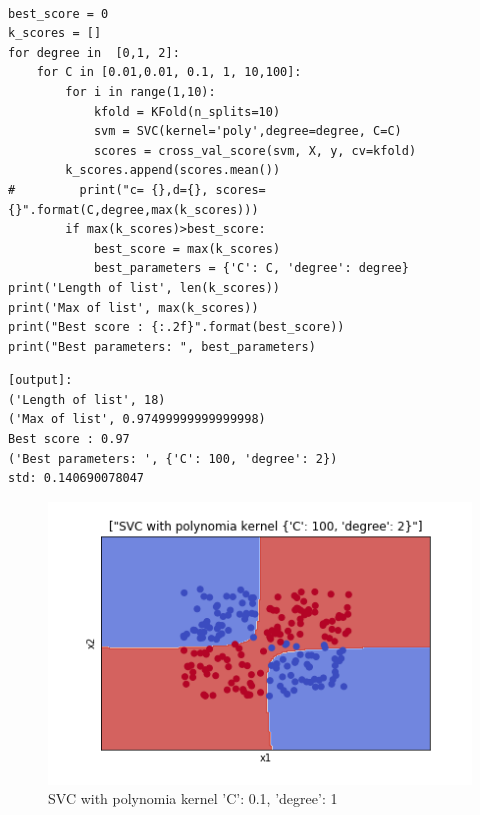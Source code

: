 \documentclass[10pt,a4paper]{article}
\begin{document}
\lstset{%
basicstyle=\small, %
identifierstyle=, %
stringstyle=\ttfamily, %
showstringspaces=false} %

\lstset{language=Python}          %

\begin{lstlisting}[label=loaddata,caption=Importing the data]  % Start your code-block

best_score = 0
k_scores = []
for degree in  [0,1, 2]:
    for C in [0.01,0.01, 0.1, 1, 10,100]:        
        for i in range(1,10):               
            kfold = KFold(n_splits=10)
            svm = SVC(kernel='poly',degree=degree, C=C)
            scores = cross_val_score(svm, X, y, cv=kfold)
        k_scores.append(scores.mean())
#         print("c= {},d={}, scores={}".format(C,degree,max(k_scores)))
        if max(k_scores)>best_score:
            best_score = max(k_scores)
            best_parameters = {'C': C, 'degree': degree}
print('Length of list', len(k_scores))
print('Max of list', max(k_scores))
print("Best score : {:.2f}".format(best_score))
print("Best parameters: ", best_parameters)

\end{lstlisting}

\begin{verbatim}
[output]:
('Length of list', 18)
('Max of list', 0.97499999999999998)
Best score : 0.97
('Best parameters: ', {'C': 100, 'degree': 2})
std: 0.140690078047
\end{verbatim}

\graphicspath{ {/images/} }
\begin{figure}[!h]
\includegraphics[scale=0.75]{images/P2/polyd1c01.png}
  \caption{SVC with polynomia kernel {'C': 0.1, 'degree': 1}}
  \label{fig:poly_ker}
\end{figure}
\clearpage
\end{document}
